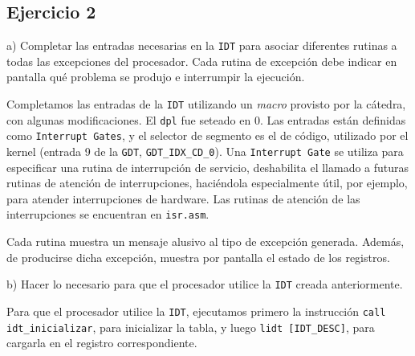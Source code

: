 \vspace*{0.5cm} \noindent



\newpage





\subsection*{Ejercicio 2}
\vspace*{0.5cm}

\noindent
a) Completar las entradas necesarias en la \verb|IDT| para asociar diferentes rutinas a todas las
excepciones del procesador. Cada rutina de excepción debe indicar en pantalla qué problema se produjo
e interrumpir la ejecución.

\vspace*{0.3cm}

Completamos las entradas de la \verb|IDT| utilizando un \textit{macro} provisto por la c\'atedra, con 
algunas modificaciones. El \verb|dpl| fue seteado en 0.
Las entradas est\'an definidas como \verb|Interrupt Gates|, y el selector de segmento es el de 
c\'odigo, utilizado por el kernel (entrada 9 de la \verb|GDT|, \verb|GDT_IDX_CD_0|). Una \verb|Interrupt Gate| se 
utiliza para especificar una rutina de interrupci\'on de servicio, deshabilita el llamado a futuras rutinas de 
atenci\'on de interrupciones, haci\'endola especialmente \'util, por ejemplo, para atender interrupciones de hardware.
Las rutinas de atención de las interrupciones se encuentran en \verb|isr.asm|.

Cada rutina muestra un mensaje alusivo al tipo de excepci\'on generada. Adem\'as, de producirse dicha 
excepci\'on, muestra por pantalla el estado de los registros.

\vspace*{0.5cm} \noindent



\noindent
b) Hacer lo necesario para que el procesador utilice la \verb|IDT| creada anteriormente.

\vspace*{0.3cm}

Para que el procesador utilice la \verb|IDT|, ejecutamos primero la instrucci\'on \verb|call idt_inicializar|, 
para inicializar la tabla, y luego \verb|lidt [IDT_DESC]|, para cargarla en el registro correspondiente.

\vspace*{0.5cm} \noindent



